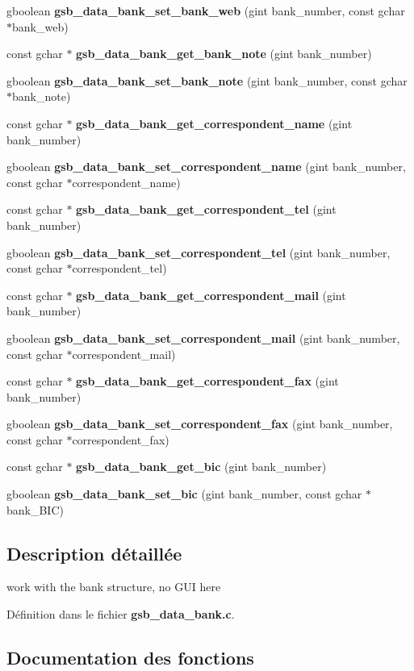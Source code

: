 \begin{DoxyCompactItemize}
\item 
gboolean {\bf gsb\_\-data\_\-bank\_\-set\_\-bank\_\-web} (gint bank\_\-number, const gchar $\ast$bank\_\-web)
\item 
const gchar $\ast$ {\bf gsb\_\-data\_\-bank\_\-get\_\-bank\_\-note} (gint bank\_\-number)
\item 
gboolean {\bf gsb\_\-data\_\-bank\_\-set\_\-bank\_\-note} (gint bank\_\-number, const gchar $\ast$bank\_\-note)
\item 
const gchar $\ast$ {\bf gsb\_\-data\_\-bank\_\-get\_\-correspondent\_\-name} (gint bank\_\-number)
\item 
gboolean {\bf gsb\_\-data\_\-bank\_\-set\_\-correspondent\_\-name} (gint bank\_\-number, const gchar $\ast$correspondent\_\-name)
\item 
const gchar $\ast$ {\bf gsb\_\-data\_\-bank\_\-get\_\-correspondent\_\-tel} (gint bank\_\-number)
\item 
gboolean {\bf gsb\_\-data\_\-bank\_\-set\_\-correspondent\_\-tel} (gint bank\_\-number, const gchar $\ast$correspondent\_\-tel)
\item 
const gchar $\ast$ {\bf gsb\_\-data\_\-bank\_\-get\_\-correspondent\_\-mail} (gint bank\_\-number)
\item 
gboolean {\bf gsb\_\-data\_\-bank\_\-set\_\-correspondent\_\-mail} (gint bank\_\-number, const gchar $\ast$correspondent\_\-mail)
\item 
const gchar $\ast$ {\bf gsb\_\-data\_\-bank\_\-get\_\-correspondent\_\-fax} (gint bank\_\-number)
\item 
gboolean {\bf gsb\_\-data\_\-bank\_\-set\_\-correspondent\_\-fax} (gint bank\_\-number, const gchar $\ast$correspondent\_\-fax)
\item 
const gchar $\ast$ {\bf gsb\_\-data\_\-bank\_\-get\_\-bic} (gint bank\_\-number)
\item 
gboolean {\bf gsb\_\-data\_\-bank\_\-set\_\-bic} (gint bank\_\-number, const gchar $\ast$bank\_\-BIC)
\end{DoxyCompactItemize}


\subsection{Description détaillée}
work with the bank structure, no GUI here 

Définition dans le fichier {\bf gsb\_\-data\_\-bank.c}.



\subsection{Documentation des fonctions}

